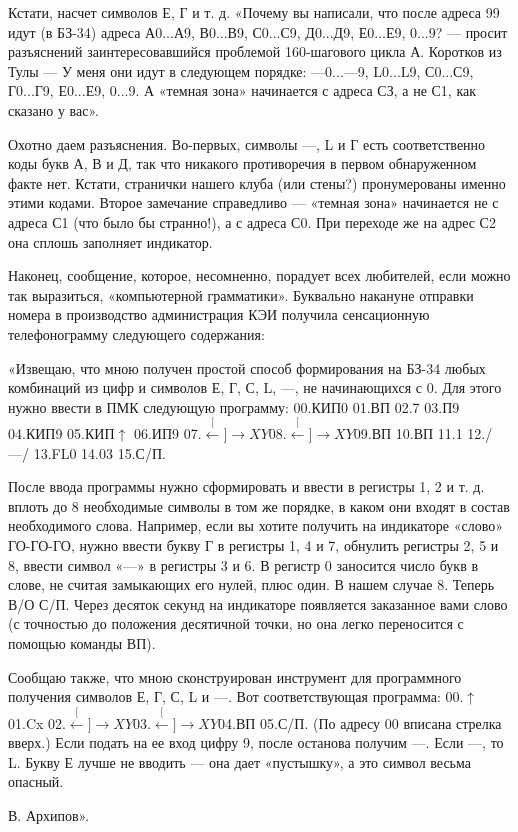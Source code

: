 \documentclass[11pt,a4paper,oneside]{article}
\def\XY{$\stackrel[\leftarrow]{\rightarrow}{XY}$}
\begin{document}
Кстати, насчет символов Е, Г и т. д. «Почему вы написали, что после адреса 99 идут (в БЗ-34) адреса А0...А9, В0...В9,	С0...С9,	Д0...Д9,	Е0...Е9, 0...9? — просит разъяснений заинтересовавшийся проблемой 160-шагового цикла А. Коротков из Тулы — У меня они идут в следующем порядке: —0...—9,	L0...L9, С0...С9,	Г0...Г9, Е0...Е9, 0...9. А «темная зона» начинается с адреса СЗ, а не С1, как сказано у вас».

Охотно даем разъяснения. Во-первых, символы —, L и Г есть соответственно коды букв А, В и Д, так что никакого противоречия в первом обнаруженном факте нет. Кстати, странички нашего клуба (или стены?) пронумерованы именно этими кодами. Второе замечание справедливо — «темная зона» начинается не с адреса С1 (что было бы странно!), а с адреса С0. При переходе же на адрес С2 она сплошь заполняет индикатор.

Наконец, сообщение, которое, несомненно, порадует всех любителей, если можно так выразиться, «компьютерной грамматики». Буквально накануне отправки номера в производство администрация КЭИ получила сенсационную телефонограмму следующего содержания:

«Извещаю, что мною получен простой способ формирования на БЗ-34 любых комбинаций из цифр и символов Е, Г, С, L, —, не начинающихся с 0. Для этого нужно ввести в ПМК следующую программу: 00.КИП0 01.ВП 02.7 03.П9 04.КИП9 05.КИП$\uparrow$ 06.ИП9 07.\XY 08.\XY 09.ВП 10.ВП 11.1 12./—/ 13.FL0 14.03 15.С/П.

После ввода программы нужно сформировать и ввести в регистры 1, 2 и т. д. вплоть до 8 необходимые символы в том же порядке, в каком они входят в состав необходимого слова. Например, если вы хотите получить на индикаторе «слово» ГО-ГО-ГО, нужно ввести букву Г в регистры 1, 4 и 7, обнулить регистры 2, 5 и 8, ввести символ «—» в регистры 3 и 6. В регистр 0 заносится число букв в слове, не считая замыкающих его нулей, плюс один. В нашем случае 8. Теперь В/О С/П. Через десяток секунд на индикаторе появляется заказанное вами слово (с точностью до положения десятичной точки, но она легко переносится с помощью команды ВП).

Сообщаю также, что мною сконструирован инструмент для программного получения символов Е, Г, С, L и —. Вот соответствующая программа: 00.$\uparrow$ 01.Cx 02.\XY 03.\XY 04.ВП 05.С/П. (По адресу 00 вписана стрелка вверх.) Если подать на ее вход цифру 9, после останова получим —. Если —, то L. Букву Е лучше не вводить — она дает «пустышку», а это символ весьма опасный.

В. Архипов».
\end{document}
